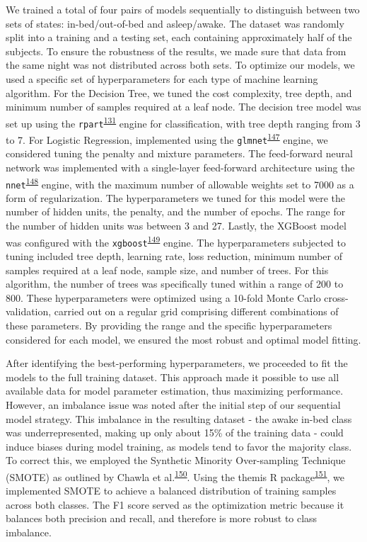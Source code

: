 \documentclass[
  10pt,
]{scrbook}
\begin{document}
We trained a total of four pairs of models sequentially to distinguish
between two sets of states: in-bed/out-of-bed and asleep/awake. The
dataset was randomly split into a training and a testing set, each
containing approximately half of the subjects. To ensure the robustness
of the results, we made sure that data from the same night was not
distributed across both sets. To optimize our models, we used a specific
set of hyperparameters for each type of machine learning algorithm. For
the Decision Tree, we tuned the cost complexity, tree depth, and minimum
number of samples required at a leaf node. The decision tree model was
set up using the
\texttt{rpart}\textsuperscript{\protect\hyperlink{ref-rpart}{131}}
engine for classification, with tree depth ranging from 3 to 7. For
Logistic Regression, implemented using the
\texttt{glmnet}\textsuperscript{\protect\hyperlink{ref-friedman_glmnet_2010}{147}}
engine, we considered tuning the penalty and mixture parameters. The
feed-forward neural network was implemented with a single-layer
feed-forward architecture using the
\texttt{nnet}\textsuperscript{\protect\hyperlink{ref-nnet}{148}} engine,
with the maximum number of allowable weights set to 7000 as a form of
regularization. The hyperparameters we tuned for this model were the
number of hidden units, the penalty, and the number of epochs. The range
for the number of hidden units was between 3 and 27. Lastly, the XGBoost
model was configured with the
\texttt{xgboost}\textsuperscript{\protect\hyperlink{ref-xgboost}{149}}
engine. The hyperparameters subjected to tuning included tree depth,
learning rate, loss reduction, minimum number of samples required at a
leaf node, sample size, and number of trees. For this algorithm, the
number of trees was specifically tuned within a range of 200 to 800.
These hyperparameters were optimized using a 10-fold Monte Carlo
cross-validation, carried out on a regular grid comprising different
combinations of these parameters. By providing the range and the
specific hyperparameters considered for each model, we ensured the most
robust and optimal model fitting.

After identifying the best-performing hyperparameters, we proceeded to
fit the models to the full training dataset. This approach made it
possible to use all available data for model parameter estimation, thus
maximizing performance. However, an imbalance issue was noted after the
initial step of our sequential model strategy. This imbalance in the
resulting dataset - the awake in-bed class was underrepresented, making
up only about 15\% of the training data - could induce biases during
model training, as models tend to favor the majority class. To correct
this, we employed the Synthetic Minority Over-sampling Technique (SMOTE)
as outlined by Chawla et
al.\textsuperscript{\protect\hyperlink{ref-chawla_smote_2002}{150}}.
Using the themis R
package\textsuperscript{\protect\hyperlink{ref-themis}{151}}, we
implemented SMOTE to achieve a balanced distribution of training samples
across both classes. The F1 score served as the optimization metric
because it balances both precision and recall, and therefore is more
robust to class imbalance.
\end{document}

